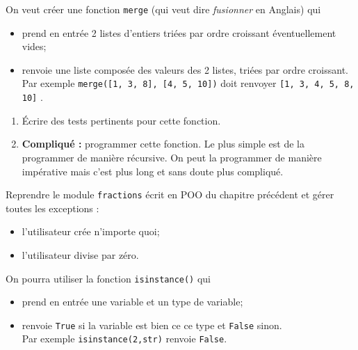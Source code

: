 \documentclass[a4paper,10pt,cours]{nsi}
\begin{document}
\begin{exercice}[]
    On veut créer une fonction \texttt{merge} (qui veut dire \textit{fusionner} en Anglais) qui
    \begin{itemize}
        \item   prend en entrée 2 listes d'entiers triées par ordre croissant éventuellement vides;
        \item   renvoie une liste composée des valeurs des 2 listes, triées par ordre croissant.
              Par exemple \texttt{merge([1, 3, 8], [4, 5, 10])} doit renvoyer \texttt{[1, 3, 4, 5, 8, 10]}    .
    \end{itemize}
    \begin{enumerate}
        \item   \'Ecrire des tests pertinents pour cette fonction.
        \item   \textbf{Compliqué :} programmer cette fonction. Le plus simple est de la programmer de manière récursive. On peut la programmer de manière impérative mais c'est plus long et sans doute plus compliqué.
    \end{enumerate}
\end{exercice}

\begin{exercice}
    Reprendre le module \texttt{fractions} écrit en POO du chapitre précédent et gérer toutes les exceptions :
    \begin{itemize}
        \item   l'utilisateur crée n'importe quoi;
        \item   l'utilisateur divise par zéro.
    \end{itemize}
    On pourra utiliser la fonction \texttt{isinstance()} qui
    \begin{itemize}
        \item   prend en entrée une variable et un type de variable;
        \item   renvoie \texttt{True} si la variable est bien ce ce type et \texttt{False} sinon.\\
              Par exemple \texttt{isinstance(2,str)} renvoie \texttt{False}.
    \end{itemize}
\end{exercice}
\end{document}
